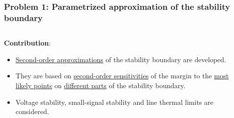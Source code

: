\documentclass{beamer}
\begin{document}
\begin{frame}
  \frametitle{Problem 1: Parametrized approximation of the stability boundary}
  \begin{columns}
    \begin{column}{0.5\textwidth}
  \textbf{Contribution}: 
  \begin{itemize}
  \item \underline{Second-order approximations} of the stability boundary are developed. 
  \item They are based on \underline{second-order sensitivities} of the margin to the \underline{most likely points} on \underline{different parts} of the stability boundary.  \item Voltage stability, small-signal stability and line thermal limits are considered.
  \end{itemize}      
    \end{column}
    \begin{column}{0.5\textwidth}

\end{column}
\end{columns}
\end{frame}
\end{document}
